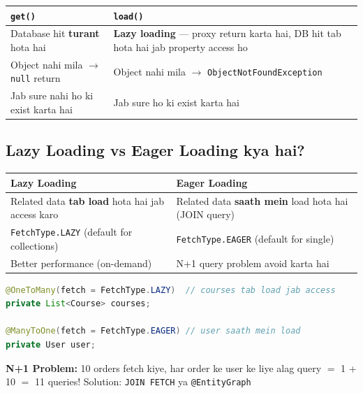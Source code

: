 \documentclass[12pt,a4paper]{article}
\begin{document}
\begin{answerbox}
\begin{center}
\begin{tabular}{p{6cm} p{6cm}}
\toprule
\textbf{\texttt{get()}} & \textbf{\texttt{load()}} \\
\midrule
Database hit \textbf{turant} hota hai & \textbf{Lazy loading} --- proxy return karta hai, DB hit tab hota hai jab property access ho \\
Object nahi mila $\rightarrow$ \texttt{null} return & Object nahi mila $\rightarrow$ \texttt{ObjectNotFoundException} \\
Jab sure nahi ho ki exist karta hai & Jab sure ho ki exist karta hai \\
\bottomrule
\end{tabular}
\end{center}
\end{answerbox}

\subsection{Lazy Loading vs Eager Loading kya hai?}

\begin{answerbox}
\begin{center}
\begin{tabular}{p{6cm} p{6cm}}
\toprule
\textbf{Lazy Loading} & \textbf{Eager Loading} \\
\midrule
Related data \textbf{tab load} hota hai jab access karo & Related data \textbf{saath mein} load hota hai (JOIN query) \\
\texttt{FetchType.LAZY} (default for collections) & \texttt{FetchType.EAGER} (default for single) \\
Better performance (on-demand) & N+1 query problem avoid karta hai \\
\bottomrule
\end{tabular}
\end{center}
\begin{lstlisting}[language=Java]
@OneToMany(fetch = FetchType.LAZY)  // courses tab load jab access
private List<Course> courses;

@ManyToOne(fetch = FetchType.EAGER) // user saath mein load
private User user;
\end{lstlisting}
\textbf{N+1 Problem:} 10 orders fetch kiye, har order ke user ke liye alag query $=$ 1 + 10 $=$ 11 queries! Solution: \texttt{JOIN FETCH} ya \texttt{@EntityGraph}
\end{answerbox}
\end{document}
